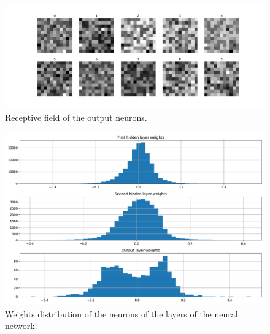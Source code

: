 \documentclass[a4paper,11pt]{article}
\begin{document}
\begin{figure}[hp]
    \centering
    \caption{Receptive field of the output neurons.}
    \label{fig:Receptive}
    \includegraphics[width=\linewidth]{../Figure/ReceptiveField.pdf}
\end{figure}

\begin{figure}[hp]
    \centering
    \caption{Weights distribution of the neurons of the layers of the neural network.}
    \label{fig:Weights}
    \includegraphics[width=.75\linewidth]{../Figure/Weights.pdf}
\end{figure}
\end{document}
